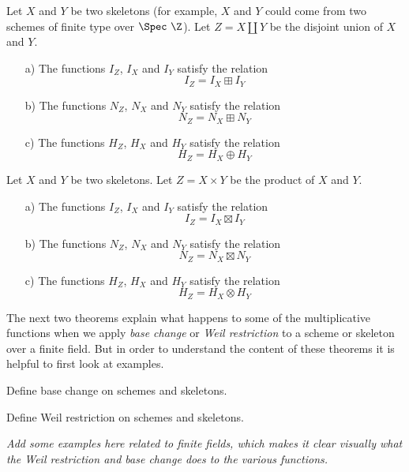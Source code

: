 \begin{theorem}
Let $X$ and $Y$ be two skeletons (for example, $X$ and $Y$ could come from two schemes of finite type over $\Spec \ \Z$). Let $Z = X \coprod Y$ be the disjoint union of $X$ and $Y$.
\begin{itemize}
\item[a)] The functions $I_Z$, $I_X$ and $I_Y$ satisfy the relation
$$  I_Z = I_X \boxplus I_Y   $$
\item[b)] The functions $N_Z$, $N_X$ and $N_Y$ satisfy the relation
$$  N_Z = N_X \boxplus N_Y   $$
\item[c)] The functions $H_Z$, $H_X$ and $H_Y$ satisfy the relation
$$  H_Z = H_X \oplus H_Y   $$

\end{itemize}
\end{theorem}


\begin{theorem}
Let $X$ and $Y$ be two skeletons. Let $Z = X \times Y$ be the product of $X$ and $Y$.
\begin{itemize}
\item[a)] The functions $I_Z$, $I_X$ and $I_Y$ satisfy the relation
$$  I_Z = I_X \boxtimes I_Y   $$
\item[b)] The functions $N_Z$, $N_X$ and $N_Y$ satisfy the relation
$$  N_Z = N_X \boxtimes N_Y   $$
\item[c)] The functions $H_Z$, $H_X$ and $H_Y$ satisfy the relation
$$  H_Z = H_X \otimes H_Y   $$

\end{itemize}
\end{theorem}

The next two theorems explain what happens to some of the multiplicative functions when we apply \emph{base change} or \emph{Weil restriction} to a scheme or skeleton over a finite field. But in order to understand the content of these theorems it is helpful to first look at examples.

\begin{definition}
Define base change on schemes and skeletons.
\end{definition}


\begin{definition}
Define Weil restriction on schemes and skeletons.
\end{definition}

\emph{Add some examples here related to finite fields, which makes it clear visually what the Weil restriction and base change does to the various functions.}

